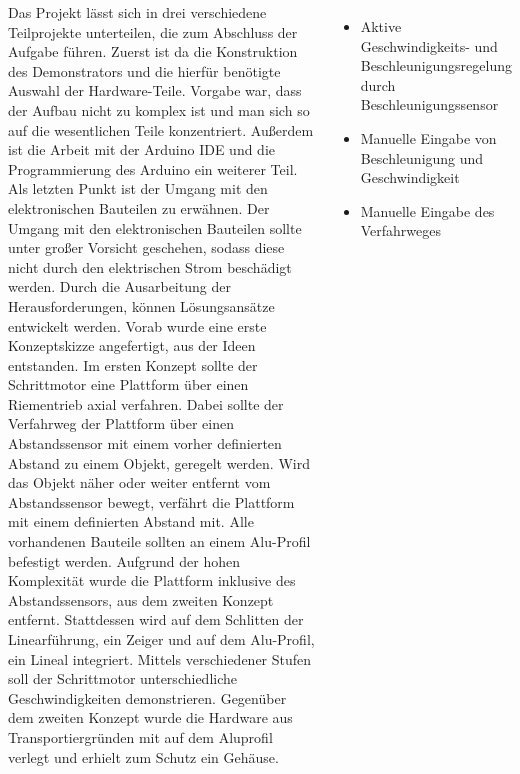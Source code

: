 \documentclass[25pt,a0paper, portrait]{tikzposter}
\begin{document}
\begin{columns}
	
	{
		{
			Das Projekt lässt sich in drei verschiedene Teilprojekte unterteilen, die zum Abschluss der Aufgabe führen. Zuerst ist da die Konstruktion des Demonstrators und die hierfür benötigte Auswahl der Hardware-Teile. Vorgabe war, dass der Aufbau nicht zu komplex ist und man sich so auf die wesentlichen Teile konzentriert. Außerdem ist die Arbeit mit der Arduino IDE und die Programmierung des Arduino ein weiterer Teil. Als letzten Punkt ist der Umgang mit den elektronischen Bauteilen zu erwähnen. Der Umgang mit den elektronischen Bauteilen sollte unter großer Vorsicht geschehen, sodass diese nicht durch den elektrischen Strom beschädigt werden.
		}
		{
			Durch die Ausarbeitung der Herausforderungen, können Lösungsansätze	entwickelt werden. Vorab wurde eine erste Konzeptskizze angefertigt, aus der Ideen entstanden. Im ersten Konzept sollte der Schrittmotor eine Plattform über einen Riementrieb axial verfahren. Dabei sollte der Verfahrweg der Plattform über einen Abstandssensor mit einem vorher definierten Abstand zu einem Objekt, geregelt werden. Wird das Objekt näher oder weiter entfernt vom Abstandssensor bewegt, verfährt die Plattform mit einem definierten Abstand mit. Alle vorhandenen Bauteile sollten an einem Alu-Profil befestigt werden. Aufgrund der hohen Komplexität wurde die Plattform inklusive des Abstandssensors, aus dem zweiten Konzept entfernt. Stattdessen wird auf dem Schlitten der Linearführung, ein Zeiger und auf dem Alu-Profil, ein Lineal integriert. Mittels verschiedener Stufen soll der Schrittmotor unterschiedliche Geschwindigkeiten demonstrieren. Gegenüber dem zweiten Konzept wurde die Hardware aus Transportiergründen mit auf dem Aluprofil verlegt und erhielt zum Schutz ein Gehäuse.
		}
		{
			\begin{itemize}
				\item Aktive Geschwindigkeits- und Beschleunigungsregelung durch Beschleunigungssensor
				\item Manuelle Eingabe von Beschleunigung und Geschwindigkeit
				\item Manuelle Eingabe des Verfahrweges
			\end{itemize}
		}
	}
\end{columns}
\end{document}
